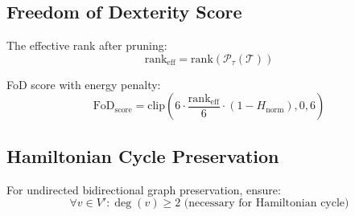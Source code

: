 \subsection{Freedom of Dexterity Score}
The effective rank after pruning:
$$\text{rank}_{\text{eff}} = \text{rank}(\mathcal{P}_\tau(\mathcal{T}))$$

FoD score with energy penalty:
$$\text{FoD}_{\text{score}} = \text{clip}\left(6 \cdot \frac{\text{rank}_{\text{eff}}}{6} \cdot (1 - H_{\text{norm}}), 0, 6\right)$$

\subsection{Hamiltonian Cycle Preservation}
For undirected bidirectional graph preservation, ensure:
$$\forall v \in V': \deg(v) \geq 2 \text{ (necessary for Hamiltonian cycle)}$$
